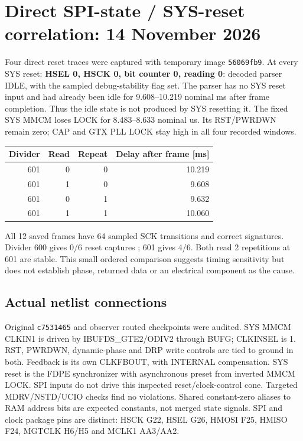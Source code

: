 \clearpage
\section{Direct SPI-state / SYS-reset correlation: 14 November 2026}
Four direct reset traces were captured with temporary image \texttt{56069fb9}.
At every SYS reset: \textbf{HSEL 0, HSCK 0, bit counter 0, reading 0}: decoded
parser IDLE, with the sampled debug-stability flag set. The parser has no
SYS reset input and had already been idle for 9.608--10.219 nominal ms after
frame completion. Thus the idle state is not produced by SYS resetting it.
The fixed SYS MMCM loses LOCK for 8.483--8.633 nominal us. Its RST/PWRDWN
remain zero; CAP and GTX PLL LOCK stay high in all four recorded windows.
\begin{center}\begin{tabular}{rrrr}\toprule
Divider & Read & Repeat & Delay after frame [ms]\\\midrule
601&0&0&10.219\\
601&1&0&9.608\\
601&0&1&9.632\\
601&1&1&10.060\\\bottomrule\end{tabular}\end{center}
All 12 saved frames have 64 sampled SCK transitions and correct signatures.
Divider 600 gives 0/6 reset captures ; 601 gives 4/6. Both read 2 repetitions at 601
are stable. This small ordered comparison suggests timing sensitivity but
does not establish phase, returned data or an electrical component as the cause.

\subsection{Actual netlist connections}
Original \texttt{c7531465} and observer routed checkpoints were audited.
SYS MMCM CLKIN1 is driven by IBUFDS\_GTE2/ODIV2 through BUFG; CLKINSEL is 1.
RST, PWRDWN, dynamic-phase and DRP write controls are tied to ground in both.
Feedback is its own CLKFBOUT, with INTERNAL compensation. SYS reset is the
FDPE synchronizer with asynchronous preset from inverted MMCM LOCK.
SPI inputs do not drive this inspected reset/clock-control cone. Targeted
MDRV/NSTD/UCIO checks find no violations. Shared constant-zero aliases to RAM
address bits are expected constants, not merged state signals.
SPI and clock package pins are distinct: HSCK G22, HSEL G26, HMOSI F25,
HMISO F24, MGTCLK H6/H5 and MCLK1 AA3/AA2.

